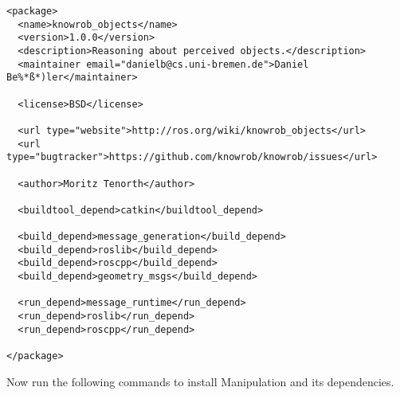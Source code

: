 \documentclass[main.tex]{subfiles}
\begin{document}
\begin{lstlisting}
<package>
  <name>knowrob_objects</name>
  <version>1.0.0</version>
  <description>Reasoning about perceived objects.</description>
  <maintainer email="danielb@cs.uni-bremen.de">Daniel Be%*ß*)ler</maintainer>

  <license>BSD</license>

  <url type="website">http://ros.org/wiki/knowrob_objects</url>
  <url type="bugtracker">https://github.com/knowrob/knowrob/issues</url>

  <author>Moritz Tenorth</author>

  <buildtool_depend>catkin</buildtool_depend>

  <build_depend>message_generation</build_depend>
  <build_depend>roslib</build_depend>
  <build_depend>roscpp</build_depend>
  <build_depend>geometry_msgs</build_depend>
  
  <run_depend>message_runtime</run_depend>
  <run_depend>roslib</run_depend>
  <run_depend>roscpp</run_depend>

</package>
\end{lstlisting}

Now run the following commands to install Manipulation and its dependencies.\\	

\begin{mdframed}[backgroundcolor=mygray, rightline=false]

\end{mdframed}
	
	
\end{document}
